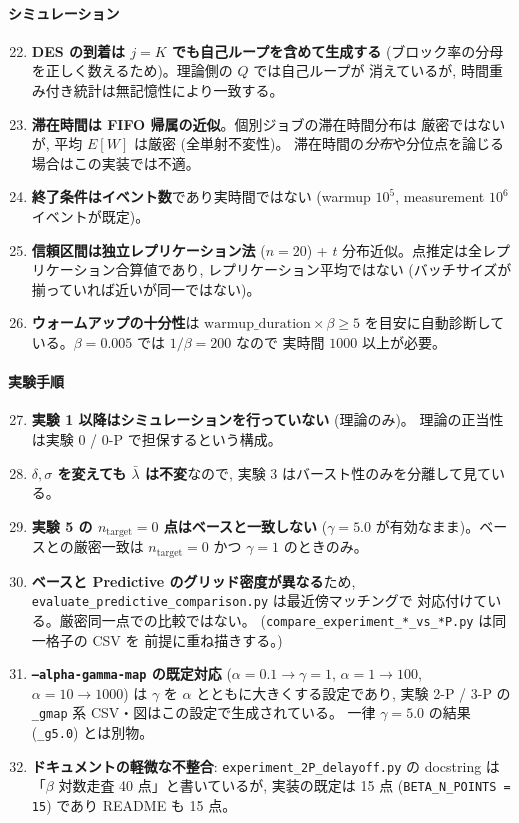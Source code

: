 \documentclass[a4paper,11pt]{article}
\newcommand{\code}[1]{\texttt{#1}}
\begin{document}
\paragraph{シミュレーション}
\begin{enumerate}\setcounter{enumi}{21}
\item \textbf{DES の到着は $j=K$ でも自己ループを含めて生成する}
      (ブロック率の分母を正しく数えるため)。理論側の $Q$ では自己ループが
      消えているが, 時間重み付き統計は無記憶性により一致する。
\item \textbf{滞在時間は FIFO 帰属の近似}。個別ジョブの滞在時間分布は
      厳密ではないが, 平均 $E[W]$ は厳密 (全単射不変性)。
      滞在時間の\emph{分布}や分位点を論じる場合はこの実装では不適。
\item \textbf{終了条件はイベント数}であり実時間ではない
      (warmup $10^5$, measurement $10^6$ イベントが既定)。
\item \textbf{信頼区間は独立レプリケーション法} ($n=20$) +
      $t$ 分布近似。点推定は全レプリケーション合算値であり,
      レプリケーション平均ではない (バッチサイズが揃っていれば近いが同一ではない)。
\item \textbf{ウォームアップの十分性}は $\mathrm{warmup\_duration}\times\beta\ge5$
      を目安に自動診断している。$\beta=0.005$ では $1/\beta=200$ なので
      実時間 $1000$ 以上が必要。
\end{enumerate}

\paragraph{実験手順}
\begin{enumerate}\setcounter{enumi}{26}
\item \textbf{実験 1 以降はシミュレーションを行っていない} (理論のみ)。
      理論の正当性は実験 0 / 0-P で担保するという構成。
\item \textbf{$\delta,\sigma$ を変えても $\bar\lambda$ は不変}なので,
      実験 3 はバースト性のみを分離して見ている。
\item \textbf{実験 5 の $n_{\mathrm{target}}=0$ 点はベースと一致しない}
      ($\gamma=5.0$ が有効なまま)。ベースとの厳密一致は
      $n_{\mathrm{target}}=0$ かつ $\gamma=1$ のときのみ。
\item \textbf{ベースと Predictive のグリッド密度が異なる}ため,
      \code{evaluate\_predictive\_comparison.py} は最近傍マッチングで
      対応付けている。厳密同一点での比較ではない。
      (\code{compare\_experiment\_*\_vs\_*P.py} は同一格子の CSV を
      前提に重ね描きする。)
\item \textbf{\code{--alpha-gamma-map} の既定対応}
      ($\alpha=0.1\!\to\!\gamma=1$, $\alpha=1\!\to\!100$, $\alpha=10\!\to\!1000$)
      は $\gamma$ を $\alpha$ とともに大きくする設定であり,
      実験 2-P / 3-P の \code{\_gmap} 系 CSV・図はこの設定で生成されている。
      一律 $\gamma=5.0$ の結果 (\code{\_g5.0}) とは別物。
\item \textbf{ドキュメントの軽微な不整合}:
      \code{experiment\_2P\_delayoff.py} の docstring は
      「$\beta$ 対数走査 40 点」と書いているが, 実装の既定は 15 点
      (\code{BETA\_N\_POINTS = 15}) であり README も 15 点。
\end{enumerate}
\end{document}
